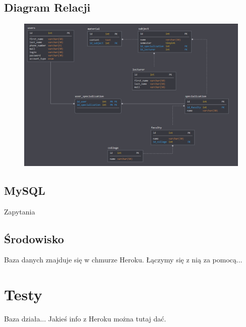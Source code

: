 \documentclass[12pt,a4paper]{article}
\begin{document}
		\subsection{Diagram Relacji}
			\begin{figure}[H]
				\centering
				\includegraphics[width=1\linewidth]{relation_model}
			\end{figure}
		\subsection{MySQL}
			Zapytania
		\subsection{Środowisko}
			Baza danych znajduje się w chmurze Heroku. Łączymy się z nią za pomocą...
	\section{Testy}
		Baza działa... Jakieś info z Heroku można tutaj dać.
\end{document}
